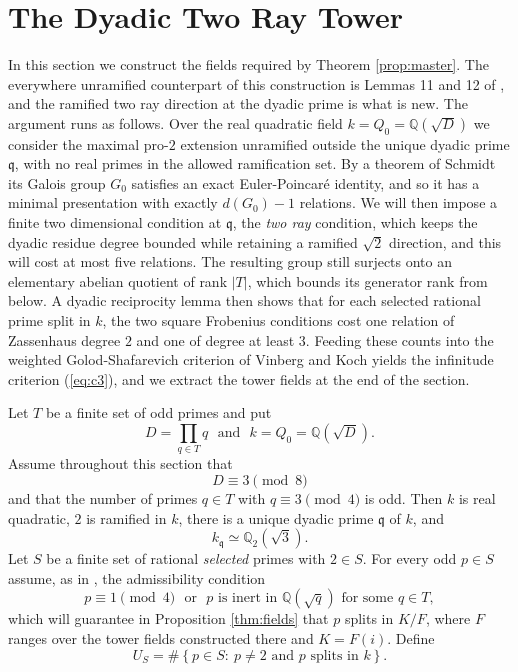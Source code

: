 \section{The Dyadic Two Ray Tower}\label{sec:dyadic}

In this section we construct the fields required by Theorem \ref{prop:master}.  The everywhere unramified counterpart of this construction is Lemmas 11 and 12 of \cite{Sawin}, and the ramified two ray direction at the dyadic prime is what is new.  The argument runs as follows.  Over the real quadratic field $k=Q_{0}=\mathbb{Q}(\sqrt D)$ we consider the maximal pro-$2$ extension unramified outside the unique dyadic prime $\mathfrak{q}$, with no real primes in the allowed ramification set.  By a theorem of Schmidt its Galois group $G_0$ satisfies an exact Euler-Poincar\'e identity, and so it has a minimal presentation with exactly $d(G_0)-1$ relations.  We will then impose a finite two dimensional condition at $\mathfrak{q}$, the \emph{two ray} condition, which keeps the dyadic residue degree bounded while retaining a ramified $\sqrt2$ direction, and this will cost at most five relations.  The resulting group still surjects onto an elementary abelian quotient of rank $|T|$, which bounds its generator rank from below.  A dyadic reciprocity lemma then shows that for each selected rational prime split in $k$, the two square Frobenius conditions cost one relation of Zassenhaus degree $2$ and one of degree at least $3$.  Feeding these counts into the weighted Golod-Shafarevich criterion of Vinberg and Koch yields the infinitude criterion (\ref{eq:c3}), and we extract the tower fields at the end of the section.

Let $T$ be a finite set of odd primes and put
\[
   D=\prod_{q\in T}q
   \ \ \ \text{and}\ \ \
   k=Q_0=\mathbb{Q}(\sqrt D).
\]
Assume throughout this section that
\[
   D\equiv3\pmod8
\]
and that the number of primes $q\in T$ with $q\equiv3\pmod4$ is odd.  Then $k$ is real quadratic, $2$ is ramified in $k$, there is a unique dyadic prime $\mathfrak{q}$ of $k$, and
\[
   k_{\mathfrak{q}}\simeq\mathbb{Q}_2(\sqrt3).
\]
Let $S$ be a finite set of rational \emph{selected} primes with $2\in S$.  For every odd $p\in S$ assume, as in \cite[Lemma 12]{Sawin}, the admissibility condition
\begin{equation}\label{eq:admissible}
   p\equiv1\pmod4
   \ \ \ \text{or}\ \ \
   p\text{ is inert in }\mathbb{Q}(\sqrt q)\text{ for some }q\in T,
\end{equation}
which will guarantee in Proposition \ref{thm:fields} that $p$ splits in $K/F$, where $F$ ranges over the tower fields constructed there and $K=F(i)$.  Define
\[
   U_S=\#\left\{p\in S:\ p\ne2\text{ and }p\text{ splits in }k\right\}.
\]

